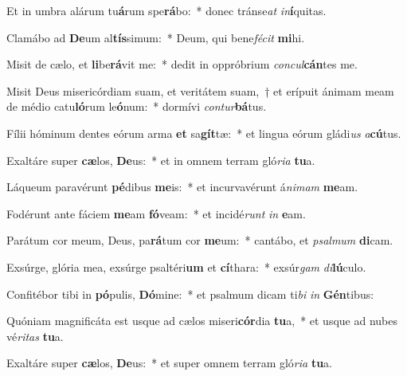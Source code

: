 \item Et in umbra alárum tu\textbf{á}rum spe\textbf{rá}bo:~* donec tránse\textit{at} \textit{in}\textbf{í}quitas.
\item Clamábo ad \textbf{De}um al\textbf{tís}simum:~* Deum, qui bene\textit{fé}\textit{cit} \textbf{mi}hi.
\item Misit de cælo, et \textbf{li}be\textbf{rá}vit me:~* dedit in oppróbrium \textit{con}\textit{cul}\textbf{cán}tes me.
\item Misit Deus misericórdiam suam, et veritátem suam,~† et erípuit ánimam meam de médio catu\textbf{ló}rum le\textbf{ó}num:~* dormívi \textit{con}\textit{tur}\textbf{bá}tus.
\item Fílii hóminum dentes eórum arma \textbf{et} sa\textbf{gít}tæ:~* et lingua eórum gládi\textit{us} \textit{a}\textbf{cú}tus.
\item Exaltáre super \textbf{cæ}los, \textbf{De}us:~* et in omnem terram gló\textit{ri}\textit{a} \textbf{tu}a.
\item Láqueum paravérunt \textbf{pé}dibus \textbf{me}is:~* et incurvavérunt á\textit{ni}\textit{mam} \textbf{me}am.
\item Fodérunt ante fáciem \textbf{me}am \textbf{fó}veam:~* et incidé\textit{runt} \textit{in} \textbf{e}am.
\item Parátum cor meum, Deus, pa\textbf{rá}tum cor \textbf{me}um:~* cantábo, et \textit{psal}\textit{mum} \textbf{di}cam.
\item Exsúrge, glória mea, exsúrge psaltéri\textbf{um} et \textbf{cí}thara:~* exsúr\textit{gam} \textit{di}\textbf{lú}culo.
\item Confitébor tibi in \textbf{pó}pulis, \textbf{Dó}mine:~* et psalmum dicam ti\textit{bi} \textit{in} \textbf{Gén}tibus:
\item Quóniam magnificáta est usque ad cælos miseri\textbf{cór}dia \textbf{tu}a,~* et usque ad nubes vé\textit{ri}\textit{tas} \textbf{tu}a.
\item Exaltáre super \textbf{cæ}los, \textbf{De}us:~* et super omnem terram gló\textit{ri}\textit{a} \textbf{tu}a.
